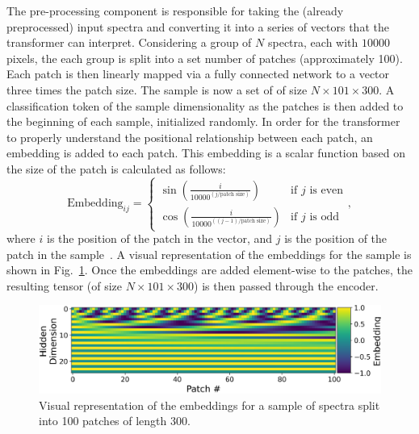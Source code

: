 The pre-processing component is responsible for taking the (already preprocessed)
input spectra and converting it into a series of vectors that the transformer can interpret. 
Considering a group of $N$ spectra, each with $10000$ pixels, the each group 
is split into a set number of patches (approximately 100). Each patch is then 
linearly mapped via a fully connected network to a vector three times the patch size.
The sample is now a set of of size $N\times101\times300$. 
A classification token of the sample dimensionality as the patches 
is then added to the beginning of each sample, initialized randomly. 
In order for the transformer to properly understand the positional relationship between each patch, an embedding 
is added to each patch. This embedding is a scalar function based on the size 
of the patch is calculated as follows: 
\begin{equation}
    \text{Embedding}_{ij} = \begin{cases} \sin\left(\frac{i}{10000^{(j / \text{patch size})}}\right) & \text{if } j \text{ is even} \\
    \cos\left(\frac{i}{10000^{((j - 1) / \text{patch size})}}\right) & \text{if } j \text{ is odd}\end{cases},
\end{equation}
where $i$ is the position of the patch in the vector, and $j$ is the position of the patch in the sample~\cite{vaswani2017}.
A visual representation of the embeddings for the sample is shown in Fig.~\ref{fig:embedding}. Once the 
embeddings are added element-wise to the patches, the resulting tensor (of size $N\times101\times300$) is then passed through the encoder. 
\begin{figure}[H]
    \centering
    \includegraphics[width=.4\linewidth]{figures/embeddings_new.png}
    \caption{Visual representation of the embeddings for a sample of spectra split into 100 patches of length 300.}
    \label{fig:embedding}
\end{figure}

